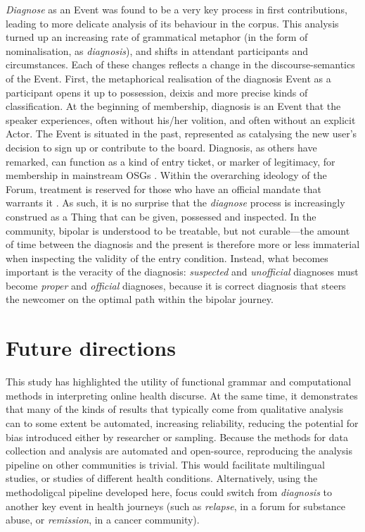 \documentclass{article}
\renewcommand{\cite}{\parencite}
\begin{document}
{\emph{Diagnose} as an Event was found to be a very key process in first contributions, leading to more delicate analysis of its behaviour in the corpus. This analysis turned up an increasing rate of grammatical metaphor (in the form of nominalisation, as \emph{diagnosis}), and shifts in attendant participants and circumstances. Each of these changes reflects a change in the discourse-semantics of the Event. First, the metaphorical realisation of the diagnosis Event as a participant opens it up to possession, deixis and more precise kinds of classification. At the beginning of membership, diagnosis is an Event that the speaker experiences, often without his\slash her volition, and often without an explicit Actor. The Event is situated in the past, represented as catalysing the new user's decision to sign up or contribute to the board. Diagnosis, as others have remarked, can function as a kind of entry ticket, or marker of legitimacy, for membership in mainstream OSGs \cite{stommel_use_2011}. Within the overarching ideology of the Forum, treatment \cite[including the talk therapy provided by Forum interaction itself---see][]{kaufman2016producing} is reserved for those who have an official mandate that warrants it \cite{vayreda_social_2009}. As such, it is no surprise that the \emph{diagnose} process is increasingly construed as a Thing that can be given, possessed and inspected. In the community, bipolar is understood to be treatable, but not curable---the amount of time between the diagnosis and the present is therefore more or less immaterial when inspecting the validity of the entry condition. Instead, what becomes important is the veracity of the diagnosis: \emph{suspected} and \emph{unofficial} diagnoses must become \emph{proper} and \emph{official} diagnoses, because it is correct diagnosis that steers the newcomer on the optimal path within the bipolar journey.

\section{Future directions}

This study has highlighted the utility of functional grammar and computational methods in interpreting online health discurse. At the same time, it demonstrates that many of the kinds of results that typically come from qualitative analysis can to some extent be automated, increasing reliability, reducing the potential for bias introduced either by researcher or sampling. Because the methods for data collection and analysis are automated and open-source, reproducing the analysis pipeline on other communities is trivial. This would facilitate multilingual studies, or studies of different health conditions. Alternatively, using the methodoligcal pipeline developed here, focus could switch from \emph{diagnosis} to another key event in health journeys (such as \emph{relapse}, in a forum for substance abuse, or \emph{remission}, in a cancer community).

}
\end{document}
